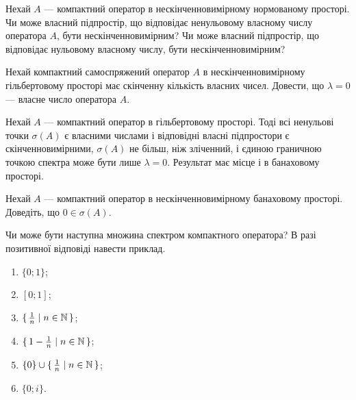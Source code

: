 
\begin{exercise}
    Нехай $A$ --- компактний оператор в нескінченновимірному нормованому просторі.
    Чи може власний підпростір, що відповідає ненульовому власному числу оператора $A$,
    бути нескінченновимірним? Чи може власний підпростір, що відповідає нульовому власному числу,
    бути нескінченновимірним?
\end{exercise}

\begin{exercise}
    Нехай компактний самоспряжений оператор $A$ в нескінченновимірному
    гільбертовому просторі має скінченну кількість власних чисел. Довести, що $\lambda = 0$
    --- власне число оператора $A$.
\end{exercise}

\begin{theory}
    \begin{theorem*}
        Нехай $A$ --- компактний оператор в гільбертовому просторі. Тоді всі
        ненульові точки $\sigma(A)$ є власними числами і відповідні власні підпростори є скінченновимірними,
        $\sigma(A)$ не більш, ніж зліченний, і єдиною граничною точкою спектра може бути лише $\lambda = 0$.
        Результат має місце і в банаховому просторі.
    \end{theorem*}
\end{theory}

\begin{exercise}
    Нехай $A$ --- компактний оператор в нескінченновимірному банаховому просторі.
    Доведіть, що $0 \in \sigma (A)$.
\end{exercise}

\begin{exercise}
    Чи може бути наступна множина спектром компактного оператора? В разі позитивної відповіді навести приклад.
    \begin{enumerate}
        \item $\{0; 1\}$;
        \item $[0; 1]$;
        \item $\set{\frac{1}{n} \mid n \in \mathbb{N}}$;
        \item $\set{1-\frac{1}{n} \mid n \in \mathbb{N}}$;
        \item $\{0\} \cup \set{\frac{1}{n} \mid n \in \mathbb{N}}$;
        \item $\{0; i\}$.
    \end{enumerate}
\end{exercise}

